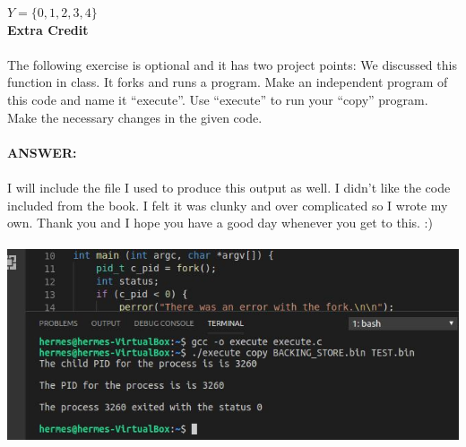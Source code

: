 \documentclass[12pt]{article}
\begin{document}
$Y = \{0, 1, 2, 3, 4\}$\\
\textbf{Extra Credit}\\\\
The following exercise is optional and it has two project points: We 
discussed this function in class. It forks and runs a program. Make 
an independent program of this code and name it “execute”. Use “execute” 
to run your “copy” program. Make the necessary changes in the given 
code.\\\\
\textbf{ANSWER: }\\\\
I will include the file I used to produce this output as well. I didn't 
like the code included from the book. I felt it was clunky and over complicated 
so I wrote my own. Thank you and I hope you have a good day whenever you get to 
this. :)\\\\
\includegraphics[width=1\textwidth]{extracredit.jpg}\\
\end{document}
